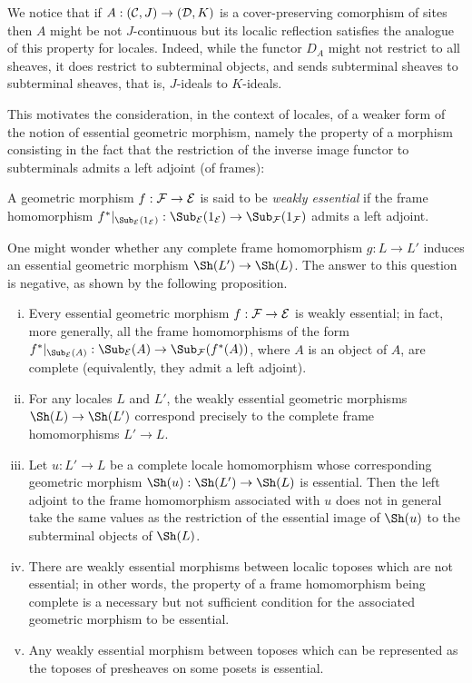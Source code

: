 \documentclass[a4paper,12pt]{article}
\begin{document}
We notice that if $A:({\cal C}, J)\to ({\cal D}, K)$ is a cover-preserving comorphism of sites then $A$ might be not $J$-continuous but its localic reflection satisfies the analogue of this property for locales. Indeed, while the functor $D_{A}$ might not restrict to all sheaves, it does restrict to subterminal objects, and sends subterminal sheaves to subterminal sheaves, that is, $J$-ideals to $K$-ideals.

This motivates the consideration, in the context of locales, of a weaker form of the notion of essential geometric morphism, namely the property of a morphism consisting in the fact that the restriction of the inverse image functor to subterminals admits a left adjoint (of frames):

\begin{definition}
	A geometric morphism $f:{\cal F}\to {\cal E}$ is said to be \emph{weakly essential} if the frame homomorphism $f^{\ast}|_{\Sub_{\cal E}(1_{\cal E})}:\Sub_{\cal E}(1_{\cal E}) \to \Sub_{\cal F}(1_{\cal F})$ admits a left adjoint.
\end{definition}

One might wonder whether any complete frame homomorphism $g:L\to L'$ induces an essential geometric morphism $\Sh(L')\to \Sh(L)$. The answer to this question is negative, as shown by the following proposition. 

\begin{proposition}\label{propmisc}
	\begin{enumerate}[(i)]
		\item Every essential geometric morphism $f:{\cal F}\to {\cal E}$ is weakly essential; in fact, more generally, all the frame homomorphisms of the form $f^{\ast}|_{\Sub_{\cal E}(A)}:\Sub_{\cal E}(A) \to \Sub_{\cal F}(f^{\ast}(A))$, where $A$ is an object of $A$, are complete (equivalently, they admit a left adjoint).
		
		\item For any locales $L$ and $L'$, the weakly essential geometric morphisms $\Sh(L)\to \Sh(L')$ correspond precisely to the complete frame homomorphisms $L'\to L$. 
		
		\item Let $u:L'\to L$ be a complete locale homomorphism whose corresponding geometric morphism $\Sh(u):\Sh(L')\to \Sh(L)$ is essential. Then the left adjoint to the frame homomorphism associated with $u$ does not in general take the same values as the restriction of the essential image of $\Sh(u)$ to the subterminal objects of $\Sh(L)$. 
		
		\item There are weakly essential morphisms between localic toposes which are not essential; in other words, the property of a frame homomorphism being complete is a necessary but not sufficient condition for the associated geometric morphism to be essential. 
		
		\item Any weakly essential morphism between toposes which can be represented as the toposes of presheaves on some posets is essential.  
	\end{enumerate}
\end{proposition} 
\end{document}
